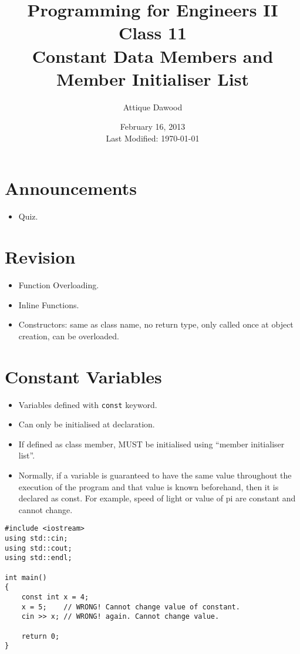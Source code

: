 \documentclass[12pt,a4paper]{article}
\title{\vspace{-2cm}Programming for Engineers II\\Class 11\\Constant Data Members and Member Initialiser List}
\author{Attique Dawood}
\date{February 16, 2013\\[0.2cm] Last Modified: \today}
\begin{document}
\maketitle
\section{Announcements}
\begin{itemize}
\item Quiz.
\end{itemize}
\section{Revision}
\begin{itemize}
\item Function Overloading.
\item Inline Functions.
\item Constructors: same as class name, no return type, only called once at object creation, can be overloaded.
\end{itemize}
\section{Constant Variables}
\begin{itemize}
\item Variables defined with \verb|const| keyword.
\item Can only be initialised at declaration.
\item If defined as class member, MUST be initialised using ``member initialiser list''.
\item Normally, if a variable is guaranteed to have the same value throughout the execution of the program and that value is known beforehand, then it is declared as const. For example, speed of light or value of pi are constant and cannot change.
\end{itemize}
\begin{lstlisting}[caption={const variable}]
#include <iostream>
using std::cin;
using std::cout;
using std::endl;

int main()
{
	const int x = 4;
	x = 5;    // WRONG! Cannot change value of constant.
	cin >> x; // WRONG! again. Cannot change value.
	
	return 0;
}
\end{lstlisting}
\end{document}
